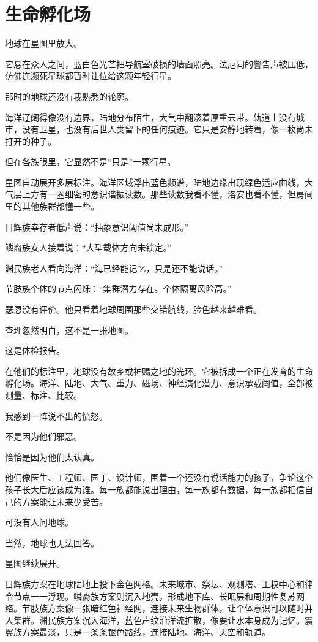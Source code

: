 \chapter{生命孵化场}

地球在星图里放大。

它悬在众人之间，蓝白色光芒把导航室破损的墙面照亮。法厄同的警告声被压低，仿佛连濒死星球都暂时让位给这颗年轻行星。

那时的地球还没有我熟悉的轮廓。

海洋辽阔得像没有边界，陆地分布陌生，大气中翻滚着厚重云带。轨道上没有城市，没有卫星，也没有后世人类留下的任何痕迹。它只是安静地转着，像一枚尚未打开的种子。

但在各族眼里，它显然不是“只是”一颗行星。

星图自动展开多层标注。海洋区域浮出蓝色频谱，陆地边缘出现绿色适应曲线，大气层上方有一圈细密的意识谐振读数。那些读数我看不懂，洛安也看不懂，但房间里的其他族群都懂一些。

日辉族幸存者低声说：“抽象意识阈值尚未成形。”

鳞裔族女人接着说：“大型载体方向未锁定。”

渊民族老人看向海洋：“海已经能记忆，只是还不能说话。”

节肢族个体的节点闪烁：“集群潜力存在。个体隔离风险高。”

瑟恩没有评价。他只看着地球周围那些交错航线，脸色越来越难看。

查理忽然明白，这不是一张地图。

这是体检报告。

在他们的标注里，地球没有故乡或神赐之地的光环。它被拆成一个正在发育的生命孵化场。海洋、陆地、大气、重力、磁场、神经演化潜力、意识承载阈值，全部被测量、标注、比较。

我感到一阵说不出的愤怒。

不是因为他们邪恶。

恰恰是因为他们太认真。

他们像医生、工程师、园丁、设计师，围着一个还没有说话能力的孩子，争论这个孩子长大后应该成为谁。每一族都能说出理由，每一族都有数据，每一族都相信自己的方案能让未来少受苦。

可没有人问地球。

当然，地球也无法回答。

星图继续展开。

日辉族方案在地球陆地上投下金色网格。未来城市、祭坛、观测塔、王权中心和律令节点一一浮现。鳞裔族方案则沉入地壳，形成地下库、长眠层和周期性复苏网络。节肢族方案像一张暗红色神经网，连接未来生物群体，让个体意识可以随时并入集群。渊民族方案沉入海洋，蓝色声纹沿洋流扩散，像要让水本身成为记忆。震翼族方案最淡，只是一条条银色路线，连接陆地、海洋、天空和轨道。

